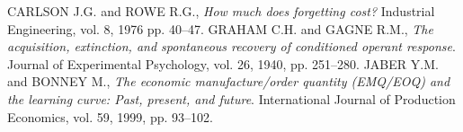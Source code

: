 \documentclass[11pt,a4paper]{article}
\begin{document}

\begin{thebibliography}{99}
 \setlength\baselineskip{5pt}
%
 CARLSON J.G. and ROWE R.G., \textit{How much does forgetting cost?} Industrial Engineering, vol. 8, 1976 pp. 40--47.
 GRAHAM C.H. and  GAGNE R.M., \textit{The acquisition, extinction, and spontaneous recovery of conditioned operant response}. Journal of Experimental Psychology, vol. 26, 1940, pp. 251--280.
 JABER Y.M. and BONNEY M., \textit{The economic manufacture/order quantity (EMQ/EOQ) and the learning curve: Past, present, and future}. International Journal of Production Economics, vol. 59, 1999, pp. 93--102.

\end{thebibliography}
\end{document}
